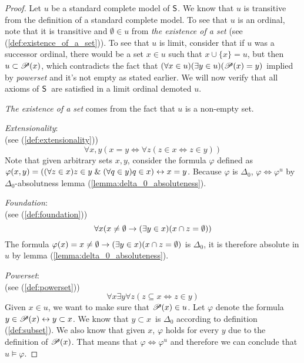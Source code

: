 \begin{proof}
Let $u$ be a standard complete model of $\sf{S}$. We know that $u$ is transitive from the definition of a standard complete model. 
To see that $u$ is an ordinal, note that it is transitive and $\emptyset \in u$ from \emph{the existence of a set} (see (\ref{def:existence_of_a_set})). To see that $u$ is limit, consider that if $u$ was a successor ordinal, there would be a set $x \in u$ such that $x \cup \{x\} = u$, but then $u \subset \mathscr{P} (x)$, which contradicts the fact that $(\forall x\in u)(\exists y \in u)(\mathscr{P} (x) = y)$ implied by \emph{powerset} and it's not empty as stated earlier.
We will now verify that all axioms of $\sf{S}$ are satisfied in a limit ordinal demoted $u$.

\bce[(i)]
\item \emph{The existence of a set} comes from the fact that $u$ is a non-empty set.

\item \emph{Extensionality}: \\(see (\ref{def:extensionality}))
\begin{equation}
\forall x, y (x = y \iff \forall z (z \in x \iff z \in y))
\end{equation}
Note that given arbitrary sets $x, y$, consider the formula $\varphi$ defined as $\varphi(x, y) = ((\forall z \in x) z \in y \mathrel{\&} (\forall q \in y) q \in x) \leftrightarrow x = y$.
Because $\varphi$ is $\Delta_0$, $\varphi \iff \varphi^u$ by $\Delta_0$-absolutness lemma (\ref{lemma:delta_0_absoluteness}).

\item \emph{Foundation}: \\(see (\ref{def:foundation}))
\begin{equation}
\forall x (x \neq \emptyset \rightarrow (\exists y \in x) (x \cap z = \emptyset))
\end{equation}
The formula $\varphi(x) = x \neq \emptyset \rightarrow (\exists y \in x) (x \cap z = \emptyset)$ is $\Delta_0$, it is therefore absolute in $u$ by lemma (\ref{lemma:delta_0_absoluteness}).

\item \emph{Powerset}: \\(see (\ref{def:powerset}))
\begin{equation}
\forall x \exists y \forall z (z \subseteq x \iff z \in y)
\end{equation}
Given $x \in u$, we want to make sure that $\mathscr{P} (x) \in u$. Let $\varphi$ denote the formula $y \in \mathscr{P} (x) \leftrightarrow y \subset x$.
We know that $y \subset x$ is $\Delta_0$ according to definition (\ref{def:subset}). We also know that given $x$, $\varphi$ holds for every $y$ due to the definition of $\mathscr{P} (x)$.
That means that $\varphi \iff \varphi^u$ and therefore we can conclude that $u \models \varphi$.



\end{proof}
